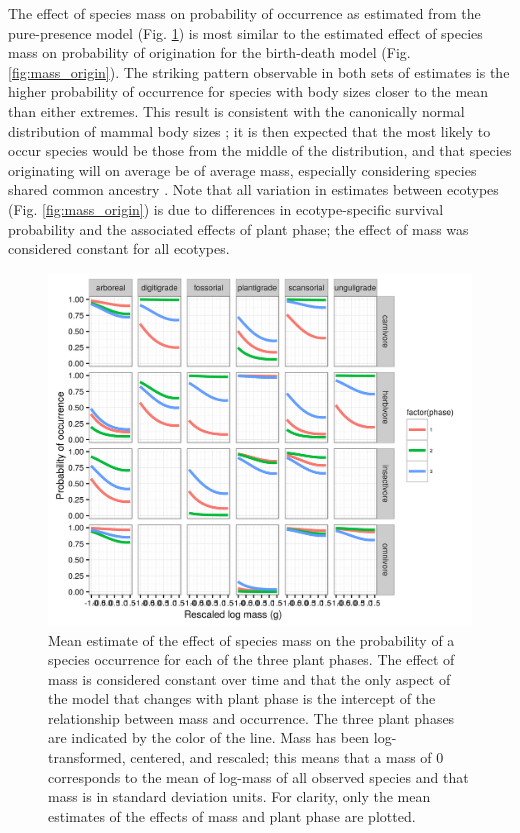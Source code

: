 \documentclass[12pt,letterpaper]{article}
\begin{document}
The effect of species mass on probability of occurrence as estimated from the pure-presence model (Fig. \ref{fig:mass_occur}) is most similar to the estimated effect of species mass on probability of origination for the birth-death model (Fig. \ref{fig:mass_origin}). The striking pattern observable in both sets of estimates is the higher probability of occurrence for species with body sizes closer to the mean than either extremes. This result is consistent with the canonically normal distribution of mammal body sizes \citep{Smith2004}; it is then expected that the most likely to occur species would be those from the middle of the distribution, and that species originating will on average be of average mass, especially considering species shared common ancestry \citep{Felsenstein1985b}. Note that all variation in estimates between ecotypes (Fig. \ref{fig:mass_origin}) is due to differences in ecotype-specific survival probability and the associated effects of plant phase; the effect of mass was considered constant for all ecotypes.

\begin{figure}[ht]
  \centering
  \includegraphics[width=\textwidth,height=0.4\textheight,keepaspectratio=true]{figure/mass_on_pres}
  \caption[Effect of mass on probability of species occurrence as estimated from the pure-presence model]{Mean estimate of the effect of species mass on the probability of a species occurrence for each of the three plant phases. The effect of mass is considered constant over time and that the only aspect of the model that changes with plant phase is the intercept of the relationship between mass and occurrence. The three plant phases are indicated by the color of the line. Mass has been log-transformed, centered, and rescaled; this means that a mass of 0 corresponds to the mean of log-mass of all observed species and that mass is in standard deviation units. For clarity, only the mean estimates of the effects of mass and plant phase are plotted.}
  \label{fig:mass_occur}
\end{figure}
\end{document}
